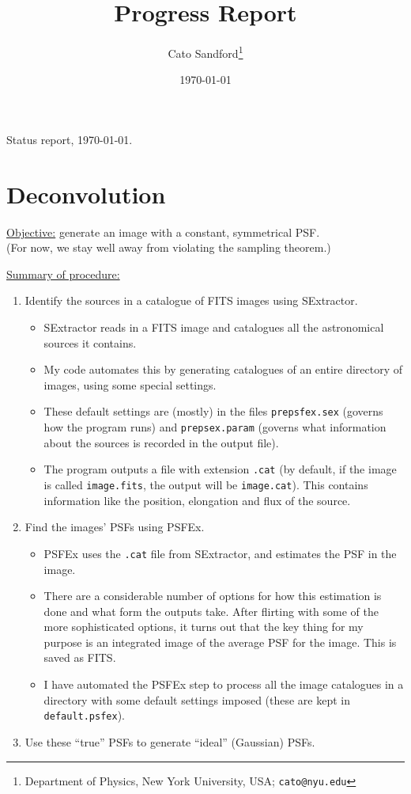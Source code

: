 \documentclass[letterpaper, 11pt]{article}
\title{Progress Report\\}
\author{Cato Sandford\thanks{Department of Physics, New York University, USA; \texttt{cato@nyu.edu}}}
\date{\today}
\begin{document}
Status report, \today.

\section{Deconvolution}


\underline{Objective:} generate an image with a constant, symmetrical PSF. \\(For now, we stay well away from violating the sampling theorem.)

\underline{Summary of procedure:}

\begin{enumerate}
	\item Identify the sources in a catalogue of FITS images using SExtractor.
		\begin{itemize}
			\item SExtractor reads in a FITS image and catalogues all the astronomical sources it contains.
			\item My code automates this by generating catalogues of an entire directory of images, using some special settings.
			\item These default settings are (mostly) in the files \texttt{prepsfex.sex} (governs how the program runs) and \texttt{prepsex.param} (governs what information about the sources is recorded in the output file).
			\item The program outputs a file with extension \texttt{.cat} (by default, if the image is called \texttt{image.fits}, the output will be \texttt{image.cat}). This contains information like the position, elongation and flux of the source.
		\end{itemize}
	\item Find the images' PSFs using PSFEx.
		\begin{itemize}
			\item PSFEx uses the \texttt{.cat} file from SExtractor, and estimates the PSF in the image.
			\item There are a considerable number of options for how this estimation is done and what form the outputs take. After flirting with some of the more sophisticated options, it turns out that the key thing for my purpose is an integrated image of the average PSF for the image. This is saved as FITS.
			\item I have automated the PSFEx step to process all the image catalogues in a directory with some default settings imposed (these are kept in \texttt{default.psfex}).
		\end{itemize}
	\item Use these ``true'' PSFs to generate ``ideal'' (Gaussian) PSFs.

\end{enumerate}
\end{document}
